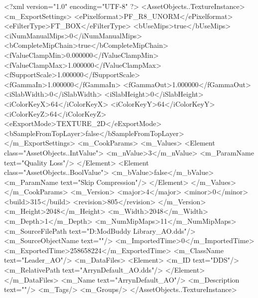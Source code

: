 <?xml version="1.0" encoding="UTF-8" ?>
<AssetObjects..TextureInstance>
	<m_ExportSettings>
		<ePixelformat>PF_R8_UNORM</ePixelformat>
		<eFilterType>FT_BOX</eFilterType>
		<bUseMips>true</bUseMips>
		<iNumManualMips>0</iNumManualMips>
		<bCompleteMipChain>true</bCompleteMipChain>
		<fValueClampMin>0.000000</fValueClampMin>
		<fValueClampMax>1.000000</fValueClampMax>
		<fSupportScale>1.000000</fSupportScale>
		<fGammaIn>1.000000</fGammaIn>
		<fGammaOut>1.000000</fGammaOut>
		<iSlabWidth>0</iSlabWidth>
		<iSlabHeight>0</iSlabHeight>
		<iColorKeyX>64</iColorKeyX>
		<iColorKeyY>64</iColorKeyY>
		<iColorKeyZ>64</iColorKeyZ>
		<eExportMode>TEXTURE_2D</eExportMode>
		<bSampleFromTopLayer>false</bSampleFromTopLayer>
	</m_ExportSettings>
	<m_CookParams>
		<m_Values>
			<Element class="AssetObjects..IntValue">
				<m_nValue>3</m_nValue>
				<m_ParamName text="Quality Loss"/>
			</Element>
			<Element class="AssetObjects..BoolValue">
				<m_bValue>false</m_bValue>
				<m_ParamName text="Skip Compression"/>
			</Element>
		</m_Values>
	</m_CookParams>
	<m_Version>
		<major>4</major>
		<minor>0</minor>
		<build>315</build>
		<revision>805</revision>
	</m_Version>
	<m_Height>2048</m_Height>
	<m_Width>2048</m_Width>
	<m_Depth>1</m_Depth>
	<m_NumMipMaps>11</m_NumMipMaps>
	<m_SourceFilePath text="D:\MyDocuments\Firaxis ModBuddy Library\Arryn\JonArryn\Maps\ArrynDefault_AO.dds"/>
	<m_SourceObjectName text=""/>
	<m_ImportedTime>0</m_ImportedTime>
	<m_ExportedTime>258658224</m_ExportedTime>
	<m_ClassName text="Leader_AO"/>
	<m_DataFiles>
		<Element>
			<m_ID text="DDS"/>
			<m_RelativePath text="ArrynDefault_AO.dds"/>
		</Element>
	</m_DataFiles>
	<m_Name text="ArrynDefault_AO"/>
	<m_Description text=""/>
	<m_Tags/>
	<m_Groups/>
</AssetObjects..TextureInstance>

